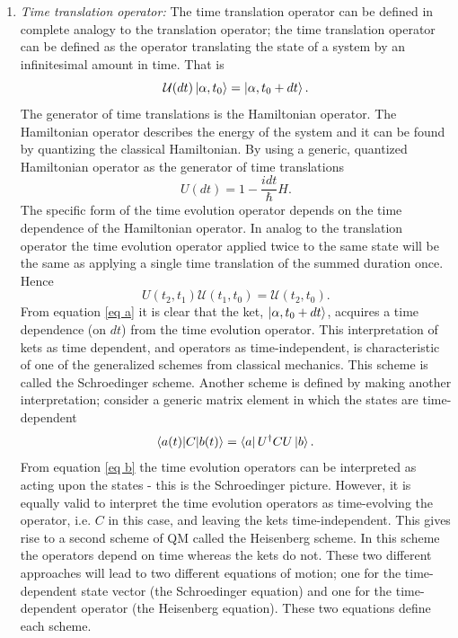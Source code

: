 \begin{enumerate}
	\item \emph{Time translation operator:}\newline
	The time translation operator can be defined in complete analogy to the translation operator; the time translation operator can be defined as the operator translating the state of a system by an infinitesimal amount in time. That is
	\begin{equation}
		\mathcal{U}(dt)\ket{\alpha,t_0}=\ket{\alpha,t_0+dt}.
		\label{eq a}
	\end{equation} 
	The generator of time translations is the Hamiltonian operator. The Hamiltonian operator describes the energy of the system and it can be found by quantizing the classical Hamiltonian. By using a generic, quantized Hamiltonian operator as the generator of time translations 
	\begin{equation}
		U(dt)=1-\frac{idt}{\hbar}H.
		\label{trans2}
	\end{equation} 
	The specific form of the time evolution operator depends on the time dependence of the Hamiltonian operator. 
	In analog to the translation operator the time evolution operator applied twice to the same state will be the same as applying a single time translation of the summed duration once. Hence
	\begin{equation}
		U(t_2,t_1)\mathcal{U}(t_1,t_0)=\mathcal{U}(t_2,t_0).
		\label{ttrans}
	\end{equation} 
	From equation \eqref{eq a} it is clear that the ket, $\ket{\alpha,t_0+dt}$, acquires a time dependence (on $dt$) from the time evolution operator. This interpretation of kets as time dependent, and operators as time-independent, is characteristic of one of the generalized schemes from classical mechanics. This scheme is called the Schroedinger scheme. Another scheme is defined by making another interpretation; consider a generic matrix element in which the states are time-dependent
	\begin{equation}
		\braket{a(t)|C|b(t)}=\bra{a}U^\dagger CU\ket{b}.
		\label{eq b}
	\end{equation} 
	From equation \eqref{eq b} the time evolution operators can be interpreted as acting upon the states - this is the Schroedinger picture. However, it is equally valid to interpret the time evolution operators as time-evolving the operator, i.e. $C$ in this case, and leaving the kets time-independent. This gives rise to a second scheme of QM called the Heisenberg scheme. In this scheme the operators depend on time whereas the kets do not. These two different approaches will lead to two different equations of motion; one for the time-dependent state vector (the Schroedinger equation) and one for the time-dependent operator (the Heisenberg equation). These two equations define each scheme.
\end{enumerate}

